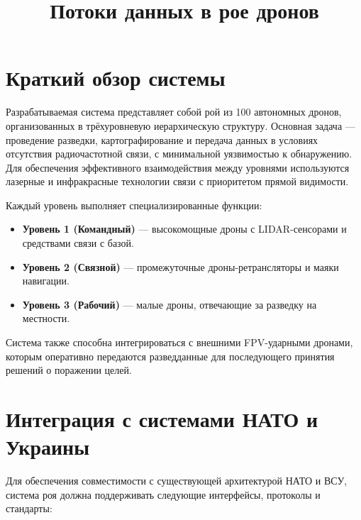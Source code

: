 \documentclass{article}
\title{Потоки данных в рое дронов}
\author{ }
\date{}
\begin{document}
\maketitle

\section*{Краткий обзор системы}

Разрабатываемая система представляет собой рой из 100 автономных дронов, организованных в трёхуровневую иерархическую структуру. Основная задача — проведение разведки, картографирование и передача данных в условиях отсутствия радиочастотной связи, с минимальной уязвимостью к обнаружению. Для обеспечения эффективного взаимодействия между уровнями используются лазерные и инфракрасные технологии связи с приоритетом прямой видимости. 

Каждый уровень выполняет специализированные функции:
\begin{itemize}
    \item \textbf{Уровень 1 (Командный)} — высокомощные дроны с LIDAR-сенсорами и средствами связи с базой.
    \item \textbf{Уровень 2 (Связной)} — промежуточные дроны-ретрансляторы и маяки навигации.
    \item \textbf{Уровень 3 (Рабочий)} — малые дроны, отвечающие за разведку на местности.
\end{itemize}

Система также способна интегрироваться с внешними FPV-ударными дронами, которым оперативно передаются разведданные для последующего принятия решений о поражении целей.

\section*{Интеграция с системами НАТО и Украины}

Для обеспечения совместимости с существующей архитектурой НАТО и ВСУ, система роя должна поддерживать следующие интерфейсы, протоколы и стандарты:
\end{document}
